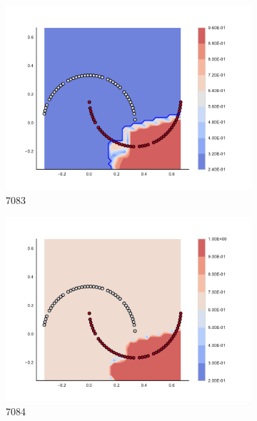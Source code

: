 \begin{figure}[h]
\begin{subfigure}[b]{0.09\textwidth}
    \includegraphics[clip, trim=2.35cm 1.75cm 4.5cm 0cm,width=\textwidth]{img/convergence/7083.pdf}
    \caption{7083}
    \label{fig:convergence_7083}
\end{subfigure}
%
\begin{subfigure}[b]{0.09\textwidth}
    \includegraphics[clip, trim=2.35cm 1.75cm 4.5cm 0cm,width=\textwidth]{img/convergence/7084.pdf}
    \caption{7084}
    \label{fig:convergence_7084}
\end{subfigure}
%
\begin{subfigure}[b]{0.09\textwidth}

\end{subfigure}
\end{figure}
